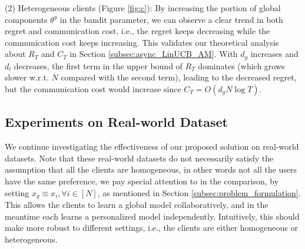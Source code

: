 (2) Heterogeneous clients (Figure \ref{fig:c}): By increasing the portion of global components $\theta^{g}$ in the bandit parameter, we can observe a clear trend in both regret and communication cost, i.e., the regret keeps decreasing while the communication cost keeps increasing. This validates our theoretical analysis about $R_{T}$ and $C_{T}$ in Section \ref{subsec:async_LinUCB_AM}. With $d_{g}$ increases and $d_{l}$ decreases, the first term in the upper bound of $R_{T}$ dominates (which grows slower w.r.t. $N$ compared with the second term), leading to the decreased regret, but the communication cost would increase since $C_{T}=O(d_{g} N \log{T})$.

\subsection{Experiments on Real-world Dataset}
We continue investigating the effectiveness of our proposed solution on real-world datasets. Note that these real-world datasets do not necessarily satisfy the assumption that all the clients are homogeneous, in other words not all the users have the same preference, we pay special attention to \modeltwo{} in the comparison, by setting $x_{g} \equiv x_{i}, \forall i \in [N]$, as mentioned in Section \ref{subsec:problem_formulation}. This allows the clients to learn a global model collaboratively, and in the meantime each learns a personalized model independently. Intuitively, this should make \modeltwo{} more robust to different settings, i.e., the clients are either homogeneous or heterogeneous.
